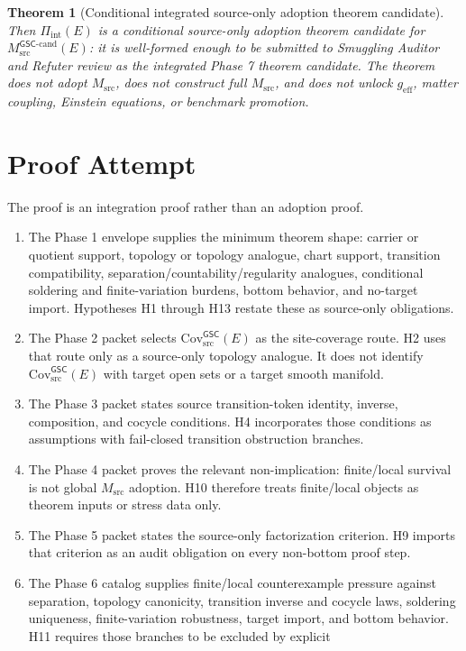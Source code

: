\documentclass[11pt]{article}
\newcommand{\Msrc}{M_{\mathrm{src}}}
\newcommand{\Mgsccand}{M_{\mathrm{src}}^{\mathsf{GSC}\mbox{-}\mathrm{cand}}}
\newcommand{\CovSrc}{\mathrm{Cov}_{\mathrm{src}}^{\mathsf{GSC}}}
\newtheorem{theorem}{Theorem}
\begin{document}
\begin{theorem}[Conditional integrated source-only adoption theorem candidate]
Then \(\Pi_{\mathrm{int}}(E)\) is a conditional source-only adoption theorem
candidate for \(\Mgsccand(E)\): it is well-formed enough to be submitted to
Smuggling Auditor and Refuter review as the integrated Phase 7 theorem
candidate. The theorem does not adopt \(\Msrc\), does not construct full
\(\Msrc\), and does not unlock \(g_{\mathrm{eff}}\), matter coupling, Einstein
equations, or benchmark promotion.
\end{theorem}

\section{Proof Attempt}

The proof is an integration proof rather than an adoption proof.

\begin{enumerate}[leftmargin=*]
  \item The Phase 1 envelope supplies the minimum theorem shape: carrier or
  quotient support, topology or topology analogue, chart support, transition
  compatibility, separation/countability/regularity analogues, conditional
  soldering and finite-variation burdens, bottom behavior, and no-target
  import. Hypotheses H1 through H13 restate these as source-only obligations.
  \item The Phase 2 packet selects \(\CovSrc(E)\) as the site-coverage route.
  H2 uses that route only as a source-only topology analogue. It does not
  identify \(\CovSrc(E)\) with target open sets or a target smooth manifold.
  \item The Phase 3 packet states source transition-token identity, inverse,
  composition, and cocycle conditions. H4 incorporates those conditions as
  assumptions with fail-closed transition obstruction branches.
  \item The Phase 4 packet proves the relevant non-implication: finite/local
  survival is not global \(\Msrc\) adoption. H10 therefore treats finite/local
  objects as theorem inputs or stress data only.
  \item The Phase 5 packet states the source-only factorization criterion. H9
  imports that criterion as an audit obligation on every non-bottom proof step.
  \item The Phase 6 catalog supplies finite/local counterexample pressure
  against separation, topology canonicity, transition inverse and cocycle
  laws, soldering uniqueness, finite-variation robustness, target import, and
  bottom behavior. H11 requires those branches to be excluded by explicit

\end{enumerate}
\end{document}
